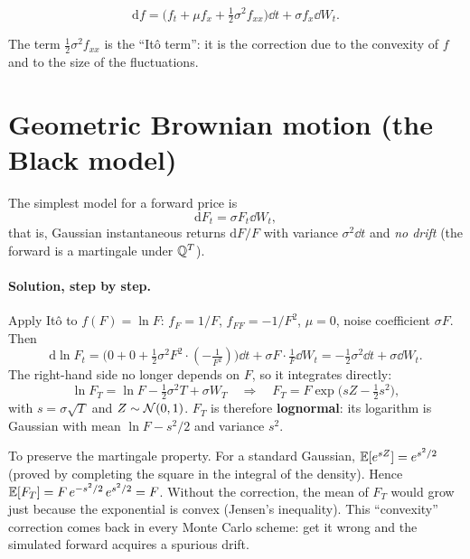 \begin{teorema}
\begin{equation}\label{eq:ito}
\mathrm{d}f=\Big(f_t+\mu f_x+\tfrac12\sigma^2 f_{xx}\Big)\dd t+\sigma f_x\dd W_t .
\end{equation}
\end{teorema}
The term $\tfrac12\sigma^2f_{xx}$ is the ``Itô term'': it is the correction due to the convexity of $f$ and to the
size of the fluctuations.

\section{Geometric Brownian motion (the Black model)}
The simplest model for a forward price is
\begin{equation}\label{eq:gbm}
\mathrm{d}F_t=\sigma F_t\dd W_t ,
\end{equation}
that is, Gaussian instantaneous returns $\mathrm{d}F/F$ with variance $\sigma^2\dd t$ and \emph{no drift} (the
forward is a martingale under $\mathbb{Q}^T$).

\paragraph{Solution, step by step.} Apply Itô to $f(F)=\ln F$: $f_F=1/F$, $f_{FF}=-1/F^2$, $\mu=0$, noise
coefficient $\sigma F$. Then
\[
\mathrm{d}\ln F_t=\Big(0+0+\tfrac12\sigma^2F^2\cdot(-\tfrac1{F^2})\Big)\dd t+\sigma F\cdot\tfrac1F\dd W_t
=-\tfrac12\sigma^2\dd t+\sigma\dd W_t .
\]
The right-hand side no longer depends on $F$, so it integrates directly:
\begin{equation}\label{eq:gbm-sol}
\ln F_T=\ln F-\tfrac12\sigma^2T+\sigma W_T
\quad\Longrightarrow\quad
F_T=F\exp\!\big(sZ-\tfrac12s^2\big),
\end{equation}
with $s=\sigma\sqrt T$ and $Z\sim\mathcal{N}(0,1)$.
$F_T$ is therefore \textbf{lognormal}: its logarithm is Gaussian with mean $\ln F-s^2/2$ and variance $s^2$.

\begin{perche}[title={Why does $-\tfrac12 s^2$ appear?}]
To preserve the martingale property. For a standard Gaussian, $\mathbb{E}[e^{sZ}]=e^{s^2/2}$ (proved by completing the
square in the integral of the density). Hence $\mathbb{E}[F_T]=F\,e^{-s^2/2}\,e^{s^2/2}=F$. Without the correction, the mean
of $F_T$ would grow just because the exponential is convex (Jensen's inequality). This ``convexity'' correction comes
back in every Monte Carlo scheme: get it wrong and the simulated forward acquires a spurious drift.
\end{perche}

